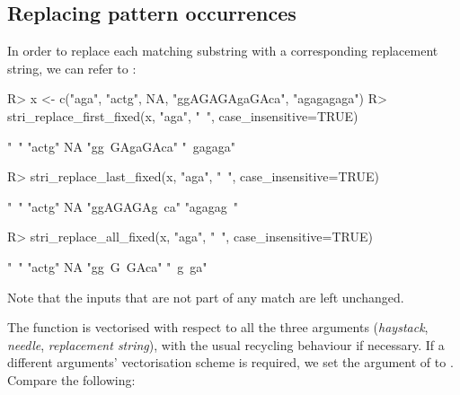\documentclass[nojss]{jss}\usepackage[]{graphicx}\usepackage[]{color}
\begin{document}
\subsection{Replacing pattern occurrences}

In order to replace each matching substring with a corresponding
replacement string, we can refer to :

\begin{Schunk}
\begin{Sinput}
R> x <- c("aga", "actg", NA, "ggAGAGAgaGAca", "agagagaga")
R> stri_replace_first_fixed(x, "aga", "~", case_insensitive=TRUE)
\end{Sinput}
\begin{Soutput}
[1] "~"           "actg"        NA            "gg~GAgaGAca" "~gagaga"
\end{Soutput}
\begin{Sinput}
R> stri_replace_last_fixed(x, "aga", "~", case_insensitive=TRUE)
\end{Sinput}
\begin{Soutput}
[1] "~"           "actg"        NA            "ggAGAGAg~ca" "agagag~"
\end{Soutput}
\begin{Sinput}
R> stri_replace_all_fixed(x, "aga", "~", case_insensitive=TRUE)
\end{Sinput}
\begin{Soutput}
[1] "~"         "actg"      NA          "gg~G~GAca" "~g~ga"
\end{Soutput}
\end{Schunk}

Note that the inputs that are not part of any match are left unchanged.

The function is vectorised with respect to all the three arguments
(\textit{haystack}, \textit{needle}, \textit{replacement string}),
with the usual recycling behaviour if necessary.
If a different arguments' vectorisation scheme is required,
we set the  argument of 
to .
Compare the following:
\end{document}
